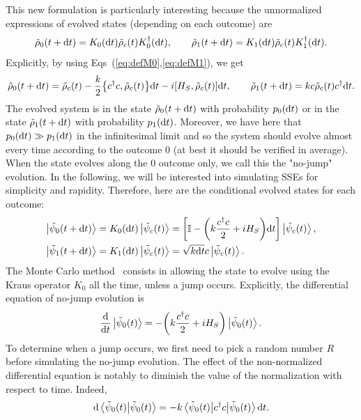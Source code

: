 This new formulation is particularly interesting because the unnormalized expressions of evolved states (depending on each outcome) are
\begin{equation}
    \tilde{\rho}_0(t+\mathrm{d}t) = K_0(\mathrm{d}t)\tilde{\rho}_c(t)K_0^\dagger(\mathrm{d}t),\qquad \tilde{\rho}_1(t+\mathrm{d}t) = K_1(\mathrm{d}t)\tilde{\rho}_c(t)K_1^\dagger(\mathrm{d}t).
\end{equation}
Explicitly, by using Eqs~(\ref{eq:defM0},\ref{eq:defM1}), we get
\begin{equation}
    \tilde{\rho}_0(t+\mathrm{d}t) = \tilde{\rho}_c(t)-\frac{k}{2}\qty{c^\dagger c, \tilde{\rho}_c(t)}\mathrm{d}t - i\qty[H_S, \tilde{\rho}_c(t)]\mathrm{d}t,\qquad \tilde{\rho}_1(t+\mathrm{d}t) = kc\tilde{\rho}_c(t)c^\dagger \mathrm{d}t.
\end{equation}
The evolved system is in the state $\tilde{\rho}_0(t+\mathrm{d}t)$ with probability $p_0(\mathrm{d}t)$ or in the state $\tilde{\rho}_1(t+\mathrm{d}t)$ with probability $p_1(\mathrm{d}t)$. Moreover, we have here that $p_0(\mathrm{d}t) \gg p_1(\mathrm{d}t)$ in the infinitesimal limit and so the system should evolve almost every time according to the outcome 0 (at best it should be verified in average). When the state evolves along the 0 outcome only, we call this the "no-jump" evolution. In the following, we will be interested into simulating SSEs for simplicity and rapidity. Therefore, here are the conditional evolved states for each outcome:
\begin{align}
    \ket{\tilde{\psi}_0(t+\mathrm{d}t)} &= K_0(\mathrm{d}t)\ket{\tilde{\psi}_c(t)} = \qty[\mathbb{I}-\qty(k\frac{c^\dagger c}{2}+i H_S)\mathrm{d}t]\ket{\tilde{\psi}_c(t)},\\
     \ket{\tilde{\psi}_1(t+\mathrm{d}t)} &= K_1(\mathrm{d}t)\ket{\tilde{\psi}_c(t)} = \sqrt{k\mathrm{d}t}c\ket{\tilde{\psi}_c(t)}.\label{eq:evolK1}
\end{align}
The Monte Carlo method~\cite{WM} consists in allowing the state to evolve using the Kraus operator $K_0$ all the time, unless a jump occurs. Explicitly, the differential equation of no-jump evolution is
\begin{equation}\label{eq:MC}
    \frac{\mathrm{d}}{\mathrm{d}t}\ket{\tilde{\psi}_0(t)} = -\qty(k\frac{c^\dagger c}{2}+i H_S)\ket{\tilde{\psi}_0(t)}.
\end{equation}
To determine when a jump occurs, we first need to pick a random number $R$ before simulating the no-jump evolution. The effect of the non-normalized differential equation is notably to diminish the value of the normalization with respect to time. Indeed,
\begin{equation}
    \mathrm{d}\braket{\tilde{\psi}_0(t)} = -k\expval{c^\dagger c}{\tilde{\psi}_0(t)} \mathrm{d}t.
\end{equation}

